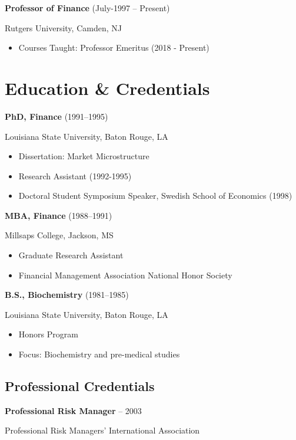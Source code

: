 \documentclass[11pt,a4paper,]{awesome-cv}
\begin{document}
\textbf{Professor of Finance} (July-1997 -- Present)

Rutgers University, Camden, NJ

\begin{itemize}
\item Courses Taught:  Professor Emeritus (2018 - Present)
\end{itemize}

\section{Education \& Credentials}\label{education-credentials}

\textbf{PhD, Finance} (1991--1995)

Louisiana State University, Baton Rouge, LA

\begin{itemize}
\item Dissertation: Market Microstructure
\item Research Assistant (1992-1995)
\item Doctoral Student Symposium Speaker, Swedish School of Economics (1998)
\end{itemize}

\textbf{MBA, Finance} (1988--1991)

Millsaps College, Jackson, MS

\begin{itemize}
\item Graduate Research Assistant
\item Financial Management Association National Honor Society
\end{itemize}

\textbf{B.S., Biochemistry} (1981--1985)

Louisiana State University, Baton Rouge, LA

\begin{itemize}
\item Honors Program
\item Focus: Biochemistry and pre-medical studies
\end{itemize}

\subsection{Professional Credentials}

\textbf{Professional Risk Manager} -- 2003

Professional Risk Managers' International Association
\end{document}
